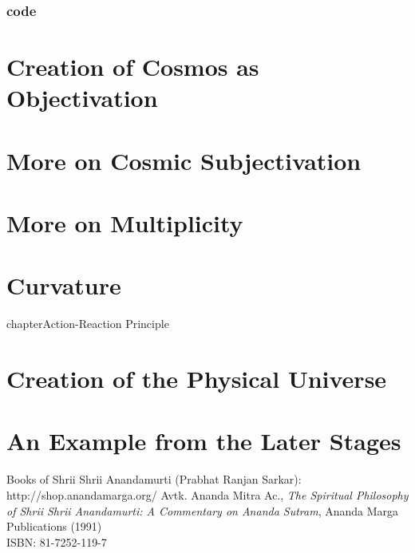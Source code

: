\documentclass[10pt]{book}
\begin{document}
\subsection{code}
\lipsum[41]


\chapter{Creation of Cosmos as Objectivation}
%
\chapter{More on Cosmic Subjectivation}
%
\chapter{More on Multiplicity}
%
\chapter{Curvature}
%
chapter{Action-Reaction Principle}
%
\chapter{Creation of the Physical Universe}
%
\chapter{An Example from the Later Stages}
%
\backmatter
%
\begin{thebibliography}{99}
Books of Shrii Shrii Anandamurti (Prabhat Ranjan Sarkar): \\
http://shop.anandamarga.org/
Avtk. Ananda Mitra Ac., \emph{The Spiritual Philosophy of Shrii Shrii Anandamurti: A Commentary on Ananda Sutram}, Ananda Marga Publications (1991) \\
ISBN: 81-7252-119-7
\end{thebibliography}
\end{document}
